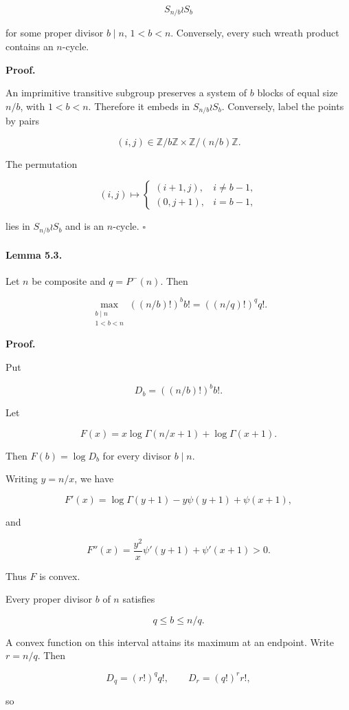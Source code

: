 \documentclass[11pt]{article}
\begin{document}
\[
S_{n/b}\wr S_b
\]

for some proper divisor $b\mid n$, $1<b<n$. Conversely, every such wreath product contains an $n$-cycle.

\noindent\textbf{Proof.}

An imprimitive transitive subgroup preserves a system of $b$ blocks of equal size $n/b$, with $1<b<n$. Therefore it embeds in $S_{n/b}\wr S_b$. Conversely, label the points by pairs

\[
(i,j)\in \mathbb Z/b\mathbb Z\times \mathbb Z/(n/b)\mathbb Z.
\]

The permutation

\[
(i,j)\mapsto
\begin{cases}
(i+1,j), & i\ne b-1,\\
(0,j+1), & i=b-1,
\end{cases}
\]

lies in $S_{n/b}\wr S_b$ and is an $n$-cycle. $\square$

\paragraph{Lemma 5.3.}

Let $n$ be composite and $q=P^-(n)$. Then

\[
\max_{\substack{b\mid n\\ 1<b<n}}
((n/b)!)^b b!
=
((n/q)!)^q q!.
\]

\noindent\textbf{Proof.}

Put

\[
D_b=((n/b)!)^b b!.
\]

Let

\[
F(x)=x\log\Gamma(n/x+1)+\log\Gamma(x+1).
\]

Then $F(b)=\log D_b$ for every divisor $b\mid n$.

Writing $y=n/x$, we have

\[
F'(x)
=
\log\Gamma(y+1)-y\psi(y+1)+\psi(x+1),
\]

and

\[
F''(x)
=
\frac{y^2}{x}\psi'(y+1)+\psi'(x+1)>0.
\]

Thus $F$ is convex.

Every proper divisor $b$ of $n$ satisfies

\[
q\le b\le n/q.
\]

A convex function on this interval attains its maximum at an endpoint. Write $r=n/q$. Then

\[
D_q=(r!)^q q!,
\qquad
D_r=(q!)^r r!,
\]

so
\end{document}
